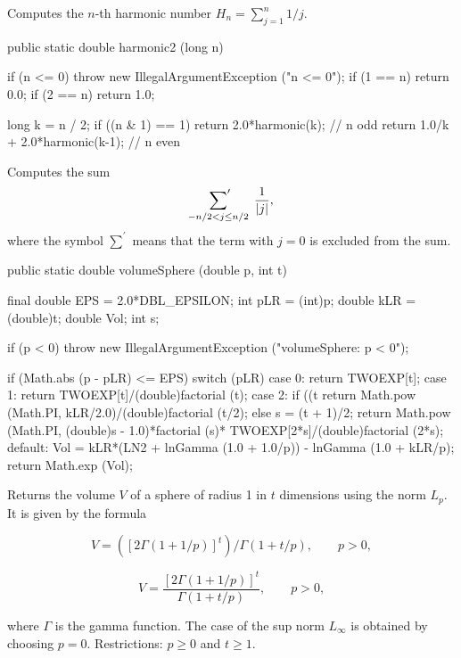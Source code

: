 \begin{tabb} Computes the $n$-th harmonic number $H_n  = \sum_{j=1}^n 1/j$.
\end{tabb}
\begin{code}

   public static double harmonic2 (long n)\begin{hide} {
      if (n <= 0)
         throw new IllegalArgumentException ("n <= 0");
      if (1 == n)
         return 0.0;
      if (2 == n)
         return 1.0;

      long k = n / 2;
      if ((n & 1) == 1)
         return  2.0*harmonic(k);         // n odd
      return  1.0/k + 2.0*harmonic(k-1);  // n even
   }\end{hide}
\end{code}
\begin{tabb} Computes the sum
\[
\sideset{}{'}\sum_{-n/2<j\le n/2}\; \frac 1{|j|},
\]
 where the symbol $\sum^\prime$ means that the term with $j=0$ is excluded
 from the sum.
\end{tabb}
\begin{code}

   public static double volumeSphere (double p, int t)\begin{hide} {
      final double EPS = 2.0*DBL_EPSILON;
      int pLR = (int)p;
      double kLR = (double)t;
      double Vol;
      int s;

      if (p < 0)
         throw new IllegalArgumentException ("volumeSphere:   p < 0");

      if (Math.abs (p - pLR) <= EPS) {
         switch (pLR) {
         case 0:
            return TWOEXP[t];
         case 1:
            return TWOEXP[t]/(double)factorial (t);
         case 2:
            if ((t %
               return Math.pow (Math.PI, kLR/2.0)/(double)factorial (t/2);
            else {
               s = (t + 1)/2;
               return Math.pow (Math.PI, (double)s - 1.0)*factorial (s)*
                  TWOEXP[2*s]/(double)factorial (2*s);
            }
          default:
         }
      }
      Vol = kLR*(LN2 + lnGamma (1.0 + 1.0/p)) -
      lnGamma (1.0 + kLR/p);
      return Math.exp (Vol);
   }\end{hide}
\end{code}
 \begin{tabb} Returns the volume $V$ of a sphere of radius 1 in $t$ dimensions
  using the norm $L_p$. It is given by the formula
\begin{htmlonly}
\[
   V = ([2\Gamma (1 + 1/p)]^t)/\Gamma(1 + t/p), \qquad p > 0,
\]
\end{htmlonly}
\begin{latexonly}
\[
       V = \frac{\left[2 \Gamma (1 + 1/p)\right]^t}
             {\Gamma\left (1 + t/p\right)}, \qquad p > 0,
\]
\end{latexonly}%
where $\Gamma$ is the gamma function.
  The case of the sup norm $L_\infty$ is  obtained by choosing $p=0$.
  Restrictions: $p\ge 0$ and $t\ge 1$.
  \end{tabb}
